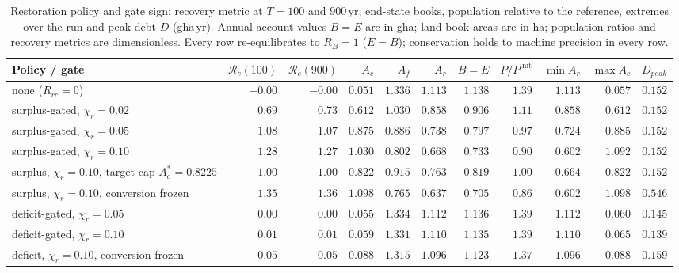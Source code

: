 \begin{table}[htbp]
\centering\scriptsize
\setlength{\tabcolsep}{2pt}
\caption{Restoration policy and gate sign: recovery metric at $T=100$ and $900$\,yr, end-state books, population relative to the reference, extremes over the run and peak debt $D$ (gha\,yr). Annual account values $B=E$ are in gha; land-book areas are in ha; population ratios and recovery metrics are dimensionless. Every row re-equilibrates to $R_B=1$ ($E=B$); conservation holds to machine precision in every row.}
\label{tab:si_gates}
\begin{tabular}{l r r r r r r r r r r}
\toprule
Policy / gate & $\mathcal R_c(100)$ & $\mathcal R_c(900)$ & $A_c$ & $A_f$ & $A_r$ & $B=E$ & $P/P^{\mathrm{init}}$ & $\min A_r$ & $\max A_c$ & $D_{peak}$ \\
\midrule
none ($R_{rc}=0$) & $-0.00$ & $-0.00$ & $0.051$ & $1.336$ & $1.113$ & $1.138$ & $1.39$ & $1.113$ & $0.057$ & $0.152$ \\
surplus-gated, $\chi_r=0.02$ & $0.69$ & $0.73$ & $0.612$ & $1.030$ & $0.858$ & $0.906$ & $1.11$ & $0.858$ & $0.612$ & $0.152$ \\
surplus-gated, $\chi_r=0.05$ & $1.08$ & $1.07$ & $0.875$ & $0.886$ & $0.738$ & $0.797$ & $0.97$ & $0.724$ & $0.885$ & $0.152$ \\
surplus-gated, $\chi_r=0.10$ & $1.28$ & $1.27$ & $1.030$ & $0.802$ & $0.668$ & $0.733$ & $0.90$ & $0.602$ & $1.092$ & $0.152$ \\
surplus, $\chi_r=0.10$, target cap $A_c^*=0.8225$ & $1.00$ & $1.00$ & $0.822$ & $0.915$ & $0.763$ & $0.819$ & $1.00$ & $0.664$ & $0.822$ & $0.152$ \\
surplus, $\chi_r=0.10$, conversion frozen & $1.35$ & $1.36$ & $1.098$ & $0.765$ & $0.637$ & $0.705$ & $0.86$ & $0.602$ & $1.098$ & $0.546$ \\
deficit-gated, $\chi_r=0.05$ & $0.00$ & $0.00$ & $0.055$ & $1.334$ & $1.112$ & $1.136$ & $1.39$ & $1.112$ & $0.060$ & $0.145$ \\
deficit-gated, $\chi_r=0.10$ & $0.01$ & $0.01$ & $0.059$ & $1.331$ & $1.110$ & $1.135$ & $1.39$ & $1.110$ & $0.065$ & $0.139$ \\
deficit, $\chi_r=0.10$, conversion frozen & $0.05$ & $0.05$ & $0.088$ & $1.315$ & $1.096$ & $1.123$ & $1.37$ & $1.096$ & $0.088$ & $0.159$ \\
\bottomrule
\end{tabular}
\end{table}

